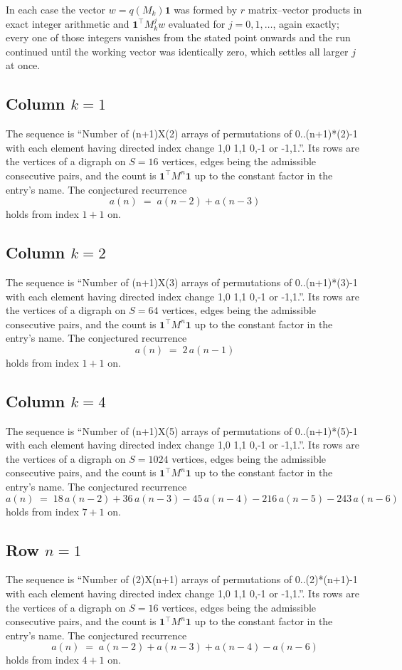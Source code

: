 \documentclass[11pt,a4paper]{article}
\theoremstyle{plain}
\theoremstyle{definition}
\begin{document}
In each case the vector $w=q(M_k)\mathbf{1}$ was formed by $r$ matrix--vector products in
exact integer arithmetic and $\mathbf{1}^{\!\top}M_k^{j}w$ evaluated for $j=0,1,\dots$,
again exactly; every one of those integers vanishes from the stated point onwards and the run
continued until the working vector was identically zero, which settles all larger $j$ at once.

\subsection*{Column $k$$=1$}
The sequence is ``Number of (n+1)X(2) arrays of permutations of 0..(n+1)*(2)-1 with each element having directed index change 1,0 1,1 0,-1 or -1,1.''. Its rows are the vertices of a digraph on
$S=16$ vertices, edges being the admissible consecutive pairs, and the count is
$\mathbf{1}^{\!\top}M^{n}\mathbf{1}$ up to the constant factor in the entry's name.
The conjectured recurrence
\[
a(n)\;=\;a(n-2) + a(n-3)
\]
holds from index $1+1$ on.

\subsection*{Column $k$$=2$}
The sequence is ``Number of (n+1)X(3) arrays of permutations of 0..(n+1)*(3)-1 with each element having directed index change 1,0 1,1 0,-1 or -1,1.''. Its rows are the vertices of a digraph on
$S=64$ vertices, edges being the admissible consecutive pairs, and the count is
$\mathbf{1}^{\!\top}M^{n}\mathbf{1}$ up to the constant factor in the entry's name.
The conjectured recurrence
\[
a(n)\;=\;2\,a(n-1)
\]
holds from index $1+1$ on.

\subsection*{Column $k$$=4$}
The sequence is ``Number of (n+1)X(5) arrays of permutations of 0..(n+1)*(5)-1 with each element having directed index change 1,0 1,1 0,-1 or -1,1.''. Its rows are the vertices of a digraph on
$S=1024$ vertices, edges being the admissible consecutive pairs, and the count is
$\mathbf{1}^{\!\top}M^{n}\mathbf{1}$ up to the constant factor in the entry's name.
The conjectured recurrence
\[
a(n)\;=\;18\,a(n-2) + 36\,a(n-3) - 45\,a(n-4) - 216\,a(n-5) - 243\,a(n-6)
\]
holds from index $7+1$ on.

\subsection*{Row $n$$=1$}
The sequence is ``Number of (2)X(n+1) arrays of permutations of 0..(2)*(n+1)-1 with each element having directed index change 1,0 1,1 0,-1 or -1,1.''. Its rows are the vertices of a digraph on
$S=16$ vertices, edges being the admissible consecutive pairs, and the count is
$\mathbf{1}^{\!\top}M^{n}\mathbf{1}$ up to the constant factor in the entry's name.
The conjectured recurrence
\[
a(n)\;=\;a(n-2) + a(n-3) + a(n-4) - a(n-6)
\]
holds from index $4+1$ on.
\end{document}
